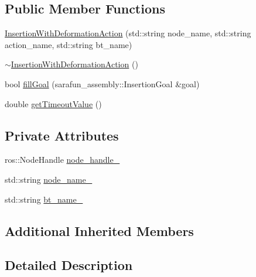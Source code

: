 \subsection*{Public Member Functions}
\begin{DoxyCompactItemize}
\item 
\hyperlink{classsarafun_1_1InsertionWithDeformationAction_a2b851f2604c6a10f32b1d4b51bfae6a8_a2b851f2604c6a10f32b1d4b51bfae6a8}{Insertion\-With\-Deformation\-Action} (std\-::string node\-\_\-name, std\-::string action\-\_\-name, std\-::string bt\-\_\-name)
\item 
\hyperlink{classsarafun_1_1InsertionWithDeformationAction_a9b8740951e51538bf47d6534b8b4fe36_a9b8740951e51538bf47d6534b8b4fe36}{$\sim$\-Insertion\-With\-Deformation\-Action} ()
\item 
bool \hyperlink{classsarafun_1_1InsertionWithDeformationAction_a32d695dfcd626c5a7ca0fa987c245083_a32d695dfcd626c5a7ca0fa987c245083}{fill\-Goal} (sarafun\-\_\-assembly\-::\-Insertion\-Goal \&goal)
\item 
double \hyperlink{classsarafun_1_1InsertionWithDeformationAction_a8d77b104fb2396000b273cb6754ff879_a8d77b104fb2396000b273cb6754ff879}{get\-Timeout\-Value} ()
\end{DoxyCompactItemize}
\subsection*{Private Attributes}
\begin{DoxyCompactItemize}
\item 
ros\-::\-Node\-Handle \hyperlink{classsarafun_1_1InsertionWithDeformationAction_a97fcbe6b19d7f2185e19f5e8397b2307_a97fcbe6b19d7f2185e19f5e8397b2307}{node\-\_\-handle\-\_\-}
\item 
std\-::string \hyperlink{classsarafun_1_1InsertionWithDeformationAction_a493a532429347d18fa4d525d982c0204_a493a532429347d18fa4d525d982c0204}{node\-\_\-name\-\_\-}
\item 
std\-::string \hyperlink{classsarafun_1_1InsertionWithDeformationAction_aa5a6397046e4d8ac145d2961d04fc27c_aa5a6397046e4d8ac145d2961d04fc27c}{bt\-\_\-name\-\_\-}
\end{DoxyCompactItemize}
\subsection*{Additional Inherited Members}


\subsection{Detailed Description}


